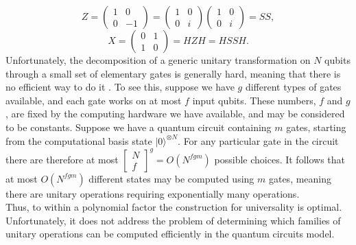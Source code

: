 \begin{equation}
    Z = \left( \begin{array}{cc} 1 & 0 \\
                                 0 & -1 \end{array} \right)
      = \left( \begin{array}{cc} 1 & 0 \\
                                 0 & i \end{array} \right)
        \left( \begin{array}{cc} 1 & 0 \\
                                 0 & i \end{array} \right)
      = SS,
\end{equation}
\begin{equation}
    X = \left( \begin{array}{cc} 0 & 1 \\
                                 1 & 0 \end{array} \right)
      = HZH = HSSH.
\end{equation}
Unfortunately, the decomposition of a generic unitary transformation on $N$ qubits through a small set of elementary gates is generally hard, meaning that there is no efficient way to do it \cite{Motta2021Dec}. To see this, suppose we have $g$ different types of gates available, and each gate works on at most $f$ input qubits. These numbers, $f$ and $g$, are fixed by the computing hardware we have available, and may be considered to be constants. Suppose we have a quantum circuit containing $m$ gates, starting from the computational basis state $|0\rangle^{\otimes N}$. For any particular gate in the circuit there are therefore at most $\left[ {\begin{array}{c} N \\ f \end{array} } \right]^g = O(N^{fgm})$ possible choices. It follows that at most $O(N^{fgm})$ different states may be computed using $m$ gates, meaning there are unitary operations requiring exponentially many operations. \\
Thus, to within a polynomial factor the construction for universality is optimal. Unfortunately, it does not address the problem of determining which families of unitary operations can be computed efficiently in the quantum circuits model. \\

